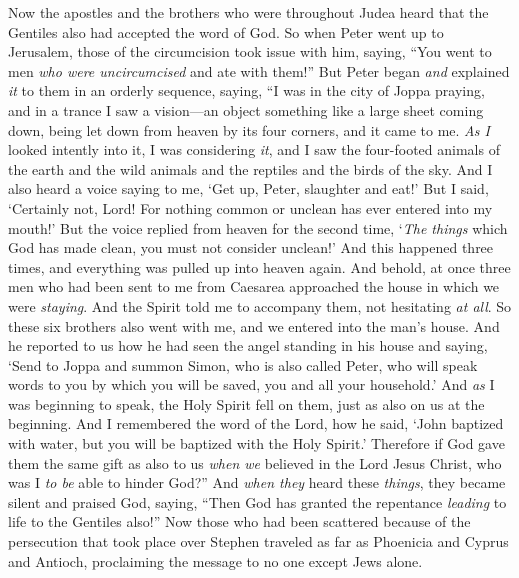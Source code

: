 \begin{biblechapter} %
 Now the apostles and the brothers who were throughout Judea heard that the Gentiles also had accepted the word of God.
\verse So when Peter went up to Jerusalem, those of the circumcision took issue with him,
\verse saying, “You went to men \textit{who were uncircumcised} and ate with them!”
\verse But Peter began \textit{and} explained \textit{it} to them in an orderly sequence, saying,
\verse “I was in the city of Joppa praying, and in a trance I saw a vision—an object something like a large sheet coming down, being let down from heaven by its four corners, and it came to me.
\verse \textit{As I} looked intently into it, I was considering \textit{it}, and I saw the four-footed animals of the earth and the wild animals and the reptiles and the birds of the sky.
\verse And I also heard a voice saying to me, ‘Get up, Peter, slaughter and eat!’
\verse But I said, ‘Certainly not, Lord! For nothing common or unclean has ever entered into my mouth!’
\verse But the voice replied from heaven for the second time, ‘\textit{The things} which God has made clean, you must not consider unclean!’
\verse And this happened three times, and everything was pulled up into heaven again.
\verse And behold, at once three men who had been sent to me from Caesarea approached the house in which we were \textit{staying}.
\verse And the Spirit told me to accompany them, not hesitating \textit{at all}. So these six brothers also went with me, and we entered into the man’s house.
\verse And he reported to us how he had seen the angel standing in his house and saying, ‘Send to Joppa and summon Simon, who is also called Peter,
\verse who will speak words to you by which you will be saved, you and all your household.’
\verse And \textit{as} I was beginning to speak, the Holy Spirit fell on them, just as also on us at the beginning.
\verse And I remembered the word of the Lord, how he said, ‘John baptized with water, but you will be baptized with the Holy Spirit.’
\verse Therefore if God gave them the same gift as also to us \textit{when we} believed in the Lord Jesus Christ, who was I \textit{to be} able to hinder God?”
\verse And \textit{when they} heard these \textit{things}, they became silent and praised God, saying, “Then God has granted the repentance \textit{leading} to life to the Gentiles also!”
 Now those who had been scattered because of the persecution that took place over Stephen traveled as far as Phoenicia and Cyprus and Antioch, proclaiming the message to no one except Jews alone.

\end{biblechapter}
